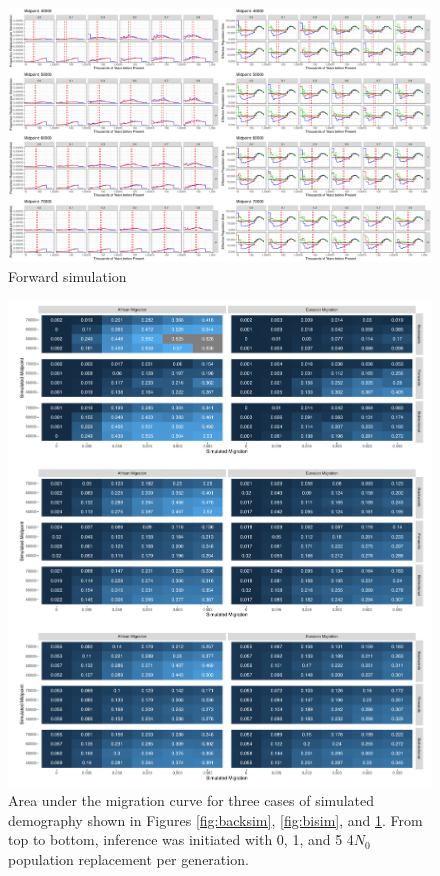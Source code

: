 \documentclass{article}
\begin{document}
\begin{figure}
	\centering
	\includegraphics[width=\textwidth]{../plot/sims/forward_different_starts.pdf}
	\caption{Forward simulation}
	\label{fig:fwdsim}
\end{figure}


\begin{figure}
	\centering
	\includegraphics[width=\textwidth]{../plot/sims/all_integrated_sims.pdf}
	\caption{Area under the migration curve for three cases of simulated demography shown in Figures \ref{fig:backsim}, \ref{fig:bisim}, and \ref{fig:fwdsim}. From top to bottom, inference was initiated with 0, 1, and 5 4$N_0$ population replacement per generation.}
	\label{fig:intsim}
\end{figure}
\end{document}
